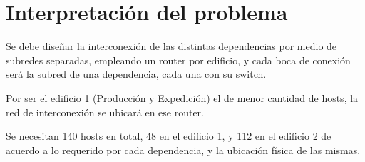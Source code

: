 \section{Interpretación del problema}
Se debe diseñar la interconexión de las distintas dependencias por medio de subredes separadas, empleando un router por edificio, y cada boca de conexión será la subred de una dependencia, cada una con su switch.

Por ser el edificio 1 (Producción y Expedición) el de menor cantidad de hosts, la red de interconexión se ubicará en ese router.

Se necesitan 140 hosts en total, 48 en el edificio 1, y 112 en el edificio 2 de acuerdo a lo requerido por cada dependencia, y la ubicación física de las mismas.